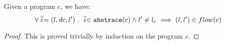 

\begin{lem}
  \label{lem:flow_to_absflow}
Given a program ${c}$, we have:
%
\[
\forall \stackrel{\scriptscriptstyle{\alpha}}{\mathtt{\epsilon}{}} = (l, dc, l') ~.~ 
\stackrel{\scriptscriptstyle{\alpha}}{\mathtt{\epsilon}{}} \in \mathtt{abs}{\mathtt{trace}}(c) \land l' \neq l_e
\implies (l, l') \in flow(c)
\]
\end{lem}
\begin{proof}
  This is proved trivially by induction on the program $c$.
\end{proof}